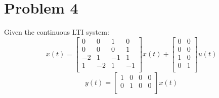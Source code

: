 \documentclass{article}
\begin{document}
\newpage
\section*{Problem 4}
Given the continuous LTI system:
$$
\dot{x}(t) =
\begin{bmatrix}
 0 &  0 &  1 &  0 \\
 0 &  0 &  0 &  1 \\
-2 &  1 & -1 &  1 \\
 1 & -2 &  1 & -1 \\
\end{bmatrix}
x(t)
+
\begin{bmatrix}
0 & 0 \\
0 & 0 \\
1 & 0 \\
0 & 1 \\
\end{bmatrix}
u(t)
$$
$$ y(t) =
\begin{bmatrix}
1 & 0 & 0 & 0 \\
0 & 1 & 0 & 0 \\
\end{bmatrix}
x(t)
$$
\end{document}
